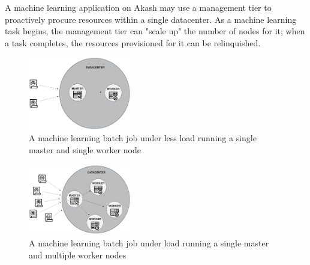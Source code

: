 \documentclass[11pt,english]{article}
\theoremstyle{definition}
\begin{document}
A machine learning application on Akash may use a management tier to proactively procure resources within a single datacenter. As a machine learning task begins, the management tier can "scale up" the number of nodes for it; when a task completes, the resources provisioned for it can be relinquished.
\begin{figure}[htp]
\centering
  \includegraphics[width=0.4\textwidth]{batch-normal}
  \caption{A machine learning batch job under less load running a single master and single worker node}
\end{figure}
\begin{figure}[htp]
\centering
  \includegraphics[width=0.4\textwidth]{batch-scale}
  \caption{A machine learning batch job under load running a single master and multiple worker nodes}
\end{figure}
\clearpage


\end{document}
